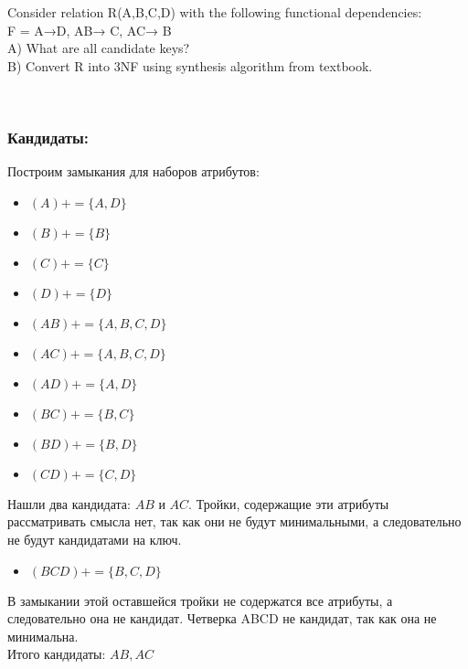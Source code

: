 \begin{problem}
    Consider relation R(A,B,C,D) with the following functional dependencies: \\
    F = {A→D, AB→ C, AC→ B} \\
    A) What are all candidate keys? \\
    B) Convert R into 3NF using synthesis algorithm from textbook.
\end{problem}
\begin{solution} \
    \subsubsection*{Кандидаты:}
    Построим замыкания для наборов атрибутов:
    \begin{itemize}
        \item \((A)+ = \{ A, D \} \)
        \item \( (B)+ = \{ B \} \)
        \item \( (C)+ = \{ C \} \)
        \item \( (D)+ = \{ D \} \)
        \item \((AB)+ = \{ A, B, C, D \} \)
        \item \((AC)+ = \{ A, B, C, D \} \)
        \item \((AD)+ = \{ A, D \} \)
        \item \((BC)+ = \{ B, C \} \)
        \item \((BD)+ = \{ B, D \} \)
        \item \((CD)+ = \{ C, D \} \)
    \end{itemize}
    Нашли два кандидата: \( AB \) и \( AC \). Тройки, содержащие эти атрибуты рассматривать смысла нет, так как они не будут минимальными, а следовательно не будут кандидатами на ключ.
    \begin{itemize}
        \item \( (BCD)+ = \{ B, C, D \} \)
    \end{itemize}
    В замыкании этой оставшейся тройки не содержатся все атрибуты, а следовательно она не кандидат. Четверка ABCD не кандидат, так как она не минимальна. \\
    Итого кандидаты: $AB, AC$

\end{solution}
